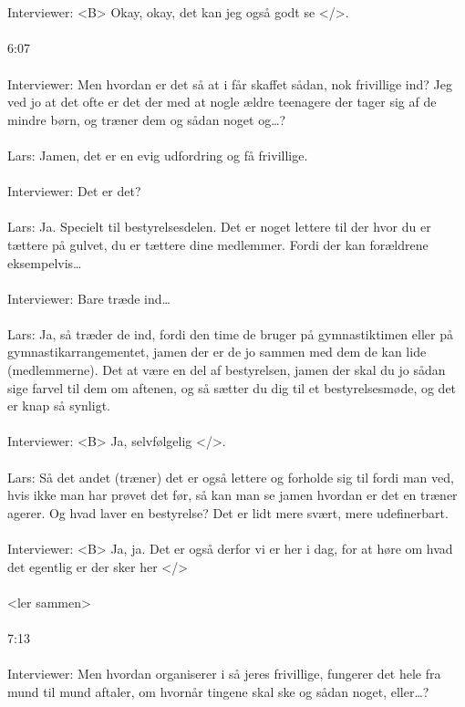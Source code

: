 \\\\
Interviewer: <B> Okay, okay, det kan jeg også godt se </>.
\\\\
6:07
\\\\
Interviewer: Men hvordan er det så at i får skaffet sådan, nok frivillige ind? Jeg ved jo at det ofte er det der med at nogle ældre teenagere der tager sig af de mindre børn, og træner dem og sådan noget og…?
\\\\
Lars: Jamen, det er en evig udfordring og få frivillige.
\\\\
Interviewer: Det er det?
\\\\
Lars: Ja. Specielt til bestyrelsesdelen. Det er noget lettere til der hvor du er tættere på gulvet, du er tættere dine medlemmer. Fordi der kan forældrene eksempelvis…
\\\\
Interviewer: Bare træde ind…
\\\\
Lars: Ja, så træder de ind, fordi den time de bruger på gymnastiktimen eller på gymnastikarrangementet, jamen der er de jo sammen med dem de kan lide (medlemmerne). Det at være en del af bestyrelsen, jamen der skal du jo sådan sige farvel til dem om aftenen, og så sætter du dig til et bestyrelsesmøde, og det er knap så synligt.
\\\\
Interviewer: <B> Ja, selvfølgelig </>.
\\\\
Lars: Så det andet (træner) det er også lettere og forholde sig til fordi man ved, hvis ikke man har prøvet det før, så kan man se jamen hvordan er det en træner agerer. Og hvad laver en bestyrelse? Det er lidt mere svært, mere udefinerbart.
\\\\
Interviewer: <B> Ja, ja. Det er også derfor vi er her i dag, for at høre om hvad det egentlig er der sker her </>
\\\\
<ler sammen>
\\\\
7:13
\\\\
Interviewer: Men hvordan organiserer i så jeres frivillige, fungerer det hele fra mund til mund aftaler, om hvornår tingene skal ske og sådan noget, eller…?

